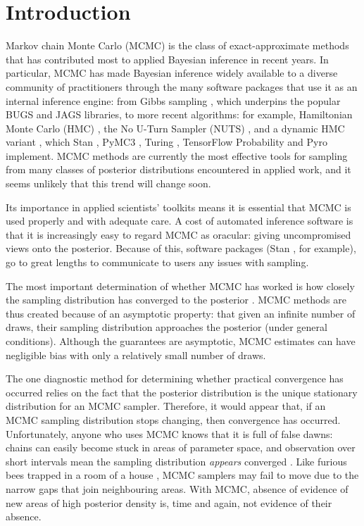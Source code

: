 \documentclass[ba]{imsart}
\numberwithin{equation}{section}
\theoremstyle{plain}
\begin{document}
	
	\section{Introduction}
	Markov chain Monte Carlo (MCMC) is the class of exact-approximate methods that has contributed most to applied Bayesian inference in recent years. In particular, MCMC has made Bayesian inference widely available to a diverse community of practitioners through the many software packages that use it as an internal inference engine: from Gibbs sampling \citep{geman1984stochastic}, which underpins the popular BUGS \citep{lunn2000winbugs} and JAGS \citep{plummer2003jags} libraries, to more recent algorithms: for example, Hamiltonian Monte Carlo (HMC) \citep{neal2011mcmc}, the No U-Turn Sampler (NUTS) \citep{hoffman2014no}, and a dynamic HMC variant \citep{betancourt2017conceptual}, which Stan \citep{carpenter2017stan}, PyMC3 \citep{salvatier2016probabilistic}, Turing \citep{ge2018turing}, TensorFlow Probability  \citep{dillon2017tensorflow} and Pyro \citep{bingham2019pyro} implement. MCMC methods are currently the most effective tools for sampling from many classes of posterior distributions encountered in applied work, and it seems unlikely that this trend will change soon.
	
	Its importance in applied scientists' toolkits means it is essential that MCMC is used properly and with adequate care. A cost of automated inference software is that it is increasingly easy to regard MCMC as oracular: giving uncompromised views onto the posterior. Because of this, software packages (Stan \citep{carpenter2017stan}, for example), go to great lengths to communicate to users any issues with sampling.
	
	The most important determination of whether MCMC has worked is how closely the sampling distribution has converged to the posterior \citep{brooks2011handbook}. MCMC methods are thus created because of an asymptotic property: that given an infinite number of draws, their sampling distribution approaches the posterior (under general conditions). Although the guarantees are asymptotic, MCMC estimates can have negligible bias with only a relatively small number of draws.
	
	The one diagnostic method for determining whether practical convergence has occurred relies on the fact that the posterior distribution is the unique stationary distribution for an MCMC sampler. Therefore, it would appear that, if an MCMC sampling distribution stops changing, then convergence has occurred. Unfortunately, anyone who uses MCMC knows that it is full of false dawns: chains can easily become stuck in areas of parameter space, and observation over short intervals mean the sampling distribution \textit{appears} converged \citep{gelman1992single}. Like furious bees trapped in a room of a house \citep{lambertbees}, MCMC samplers may fail to move due to the narrow gaps that join neighbouring areas. With MCMC, absence of evidence of new areas of high posterior density is, time and again, not evidence of their absence.
	
\end{document}
